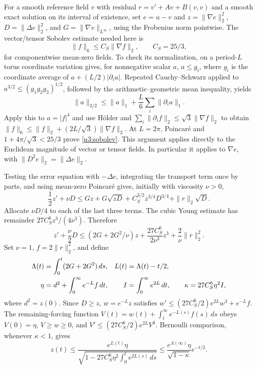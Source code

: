 For a smooth reference field $v$ with residual
$r=v'+Av+B(v,v)$ and a smooth exact solution on its interval of existence,
set $e=u-v$ and
$z=\|\nabla e\|_2^2$, $D=\|\Delta e\|_2^2$, and
$G=\|\nabla v\|_{L^\infty}$, using the Frobenius norm pointwise.
The vector/tensor Sobolev estimate needed here is
\begin{equation}
 \|f\|_6\le C_S\|\nabla f\|_2,
 \qquad C_S=25/3,
 \label{n3:sobolev}
\end{equation}
for componentwise mean-zero fields. To check its normalization, on a
period-$L$ torus coordinate variation gives, for nonnegative scalar $a$,
$a\le g_i$, where $g_i$ is the coordinate average of
$a+(L/2)|\partial_i a|$. Repeated Cauchy--Schwarz applied to
$a^{3/2}\le(g_1g_2g_3)^{1/2}$, followed by the arithmetic--geometric mean
inequality, yields
\[
 \|a\|_{3/2}\le\|a\|_1+\frac L6\sum_i\|\partial_i a\|_1.
\]
Apply this to $a=|f|^4$ and use H\"older and
$\sum_i\|\partial_i f\|_2\le\sqrt3\|\nabla f\|_2$ to obtain
$\|f\|_6\le\|f\|_2+(2L/\sqrt3)\|\nabla f\|_2$.
At $L=2\pi$, Poincar\'e and
$1+4\pi/\sqrt3<25/3$ prove \eqref{n3:sobolev}.
This argument applies directly to the Euclidean magnitude of vector or
tensor fields. In particular it applies to $\nabla e$, with
$\|D^2e\|_2=\|\Delta e\|_2$.

Testing the error equation with $-\Delta e$, integrating the transport
term once by parts, and using mean-zero Poincar\'e gives, initially with
viscosity $\nu>0$,
\[
 \frac12z'+\nu D
 \le Gz+G\sqrt{zD}
       +C_S^{3/2}z^{3/4}D^{3/4}+\|r\|_2\sqrt D.
\]
Allocate $\nu D/4$ to each of the last three terms. The cubic Young
estimate has remainder $27C_S^6z^3/(4\nu^3)$. Therefore
\begin{equation}
 z'+\frac\nu2D
 \le(2G+2G^2/\nu)z+\frac{27C_S^6}{2\nu^3}z^3
       +\frac2\nu\|r\|_2^2.
 \label{n3:h1-inequality}
\end{equation}
Set $\nu=1$, $f=2\|r\|_2^2$, and define
\begin{align}
 \Lambda(t)&=\int_0^t(2G+2G^2)\,ds,&
 L(t)&=\Lambda(t)-t/2,\notag\\
 \eta&=d^2+\int_0^\infty e^{-L}f\,dt,&
 I&=\int_0^\infty e^{2L}\,dt,\qquad
 \kappa=27C_S^6\eta^2 I,\label{n3:gate-def}
\end{align}
where $d^2=z(0)$. Since $D\ge z$, $w=e^{-L}z$ satisfies
$w'\le(27C_S^6/2)e^{2L}w^3+e^{-L}f$.
The remaining-forcing function
$V(t)=w(t)+\int_t^\infty e^{-L(s)}f(s)\,ds$ obeys
$V(0)=\eta$, $V\ge w\ge0$, and
$V'\le(27C_S^6/2)e^{2L}V^3$.
Bernoulli comparison, whenever $\kappa<1$, gives
\begin{equation}
 z(t)\le
 \frac{e^{L(t)}\eta}
 {\sqrt{1-27C_S^6\eta^2\int_0^t e^{2L(s)}\,ds}}
 \le\frac{e^{\Lambda(\infty)}\eta}{\sqrt{1-\kappa}}e^{-t/2}.
 \label{n3:scalar-bound}
\end{equation}

